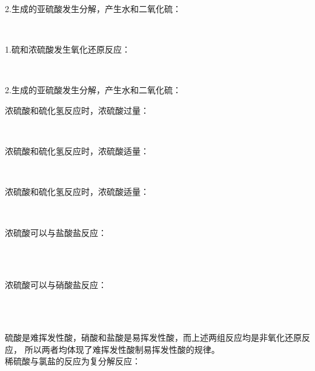 \documentclass[UTF8]{ctexart}
\begin{document}
    2.生成的亚硫酸发生分解，产生水和二氧化硫：
    \begin{center}
        \\[3mm]
    \end{center}
    1.硫和浓硫酸发生氧化还原反应：
    \begin{center}
        \\[3mm]
    \end{center}
    2.生成的亚硫酸发生分解，产生水和二氧化硫：
    \begin{center}
    \end{center}    

\newpage
    浓硫酸和硫化氢反应时，浓硫酸过量：
    \begin{center}
        \\[3mm]
    \end{center}
    浓硫酸和硫化氢反应时，浓硫酸适量：
    \begin{center}
        \\[3mm]
    \end{center}
    浓硫酸和硫化氢反应时，浓硫酸适量：
    \begin{center}
        \\[3mm]
    \end{center}
    浓硫酸可以与盐酸盐反应：
    \begin{center}
        \\[3mm]
        \\[3mm]
    \end{center}
    浓硫酸可以与硝酸盐反应：
    \begin{center}
        \\[3mm]
        \\[3mm]
    \end{center}
    硫酸是难挥发性酸，硝酸和盐酸是易挥发性酸，而上述两组反应均是非氧化还原反应，
    所以两者均体现了难挥发性酸制易挥发性酸的规律。\\[5mm]
    稀硫酸与氯盐的反应为复分解反应：
    \begin{center}
        \\[4mm]
    \end{center}
\end{document}
